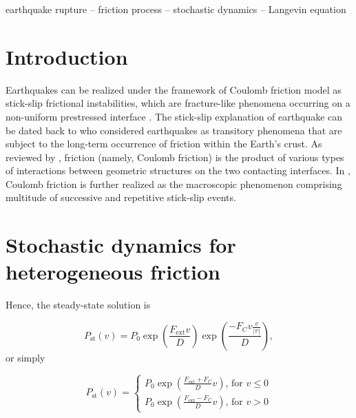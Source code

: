 \documentclass[extra]{gji} %
\begin{document}
\begin{keywords}
    earthquake rupture -- friction process -- stochastic dynamics -- Langevin equation
    
\end{keywords}

\section{Introduction}

Earthquakes can be realized under the framework of Coulomb friction model as stick-slip frictional instabilities, which are fracture-like phenomena occurring on a non-uniform prestressed interface \citep{albertiniStochasticPropertiesStatic2020}.
The stick-slip explanation of earthquake can be dated back to \citet{braceStickSlipMechanismEarthquakes1966} who considered earthquakes as transitory phenomena that are subject to the long-term occurrence of friction within the Earth's crust.
As reviewed by \citet{scholzMechanicsEarthquakesFaulting1990}, friction (namely, Coulomb friction) is the product of various types of interactions between geometric structures on the two contacting interfaces.
In \citet{haessigModelingSimulationFriction1991}, Coulomb friction is further realized as the macroscopic phenomenon comprising multitude of successive and repetitive stick-slip events.


\section{Stochastic dynamics for heterogeneous friction}

Hence, the steady-state solution is

\begin{equation}
    P_\text{st}(v) = P_0\exp\left(\frac{F_\text{ext}v}{D}\right) \exp\left(\frac{-F_C v \frac{v}{|v|}}{D}\right),
    \label{Eq_Pst_a}
\end{equation}
or simply

\begin{equation}
    P_\text{st}(v) =
    \begin{cases}
        P_0 \exp{\left( \frac{F_\text{ext}+F_C}{D} v \right)} \text{, for } v\leq 0 \\
        P_0 \exp{\left( \frac{F_\text{ext}-F_C}{D} v \right)} \text{, for } v>0
    \end{cases}
    \label{Eq_Pst_b}
\end{equation}
\end{document}
